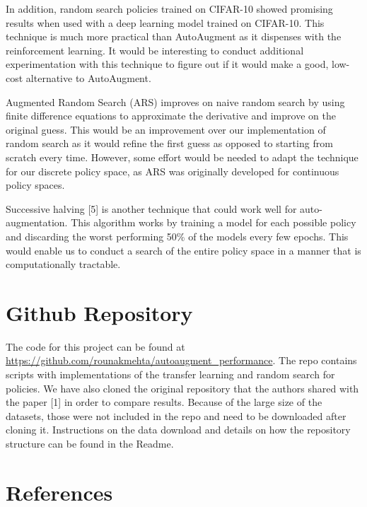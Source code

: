 \documentclass[10pt,twocolumn,letterpaper]{article}
\begin{document}
In addition, random search policies trained on CIFAR-10 showed promising results when used with a deep learning model trained on CIFAR-10. This technique is much more practical than AutoAugment as it dispenses with the reinforcement learning. It would be interesting to conduct additional experimentation with this technique to figure out if it would make a good, low-cost alternative to AutoAugment. 

Augmented Random Search (ARS) improves on naive random search by using finite difference equations to approximate the derivative and improve on the original guess. This would be an improvement over our implementation of random search as it would refine the first guess as opposed to starting from scratch every time. However, some effort would be needed to adapt the technique for our discrete policy space, as ARS was originally developed for continuous policy spaces.

Successive halving [5] is another technique that could work well for auto-augmentation. This algorithm works by training a model for each possible policy and discarding the worst performing 50\% of the models every few epochs. This would enable us to conduct a search of the entire policy space in a manner that is computationally tractable.

\section{Github Repository}

The code for this project can be found at \url{https://github.com/rounakmehta/autoaugment_performance}. The repo contains scripts with implementations of the transfer learning and random search for policies. We have also cloned the original repository that the authors shared with the paper [1] in order to compare results. Because of the large size of the datasets, those were not included in the repo and need to be downloaded after cloning it. Instructions on the data download and details on how the repository structure can be found in the Readme.  

\section{References}
\end{document}
